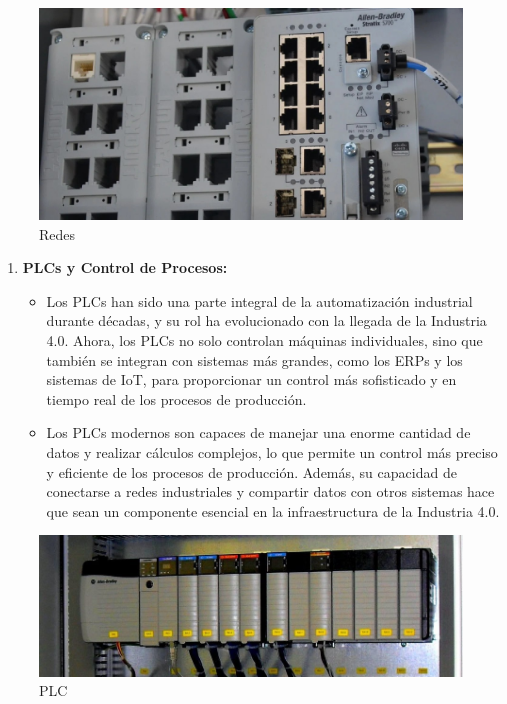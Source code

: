 \documentclass[
  10pt,
  letterpaper,
]{book}
\providecommand{\tightlist}{%
  \setlength{\itemsep}{0pt}\setlength{\parskip}{0pt}}\usepackage{longtable,booktabs,array}
\begin{document}
\begin{figure}[H]

{\centering \includegraphics{Img/ethernet.png}

}

\caption{Redes}

\end{figure}%

\begin{enumerate}
\def\labelenumi{\arabic{enumi}.}
\setcounter{enumi}{1}
\tightlist
\item
  \textbf{PLCs y Control de Procesos:}

  \begin{itemize}
  \tightlist
  \item
    Los PLCs han sido una parte integral de la automatización industrial
    durante décadas, y su rol ha evolucionado con la llegada de la
    Industria 4.0. Ahora, los PLCs no solo controlan máquinas
    individuales, sino que también se integran con sistemas más grandes,
    como los ERPs y los sistemas de IoT, para proporcionar un control
    más sofisticado y en tiempo real de los procesos de producción.
  \item
    Los PLCs modernos son capaces de manejar una enorme cantidad de
    datos y realizar cálculos complejos, lo que permite un control más
    preciso y eficiente de los procesos de producción. Además, su
    capacidad de conectarse a redes industriales y compartir datos con
    otros sistemas hace que sean un componente esencial en la
    infraestructura de la Industria 4.0.
  \end{itemize}
\end{enumerate}

\begin{figure}[H]

{\centering \includegraphics{Img/plc.jpg}

}

\caption{PLC}

\end{figure}%
\end{document}
